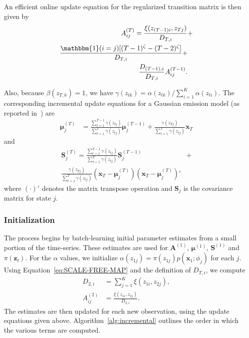 \documentclass[letterpaper]{article}
\begin{document}
An efficient online update equation for the regularized transition matrix is then given by
\begin{align*}
    A_{ij}^{(T)} = \frac{\xi(z_{(T-1)i}, z_{Tj})}{D_{T,i}} &+\\
           \frac{\mathbbm{1}(i = j)[(T-1)^\zeta - (T-2)^\zeta]}{D_{T,i}} +\\
           \frac{D_{(T-1), i}}{D_{T,i}}A_{ij}^{(T-1)}.
\end{align*}

Also, because $\beta(z_{T,k}) = 1$, we have $\gamma(z_{tk}) = \alpha(z_{tk}) / \sum_{i=1}^{K}\alpha(z_{ti})$. The corresponding incremental update equations for a Gaussian emission model (as reported in~\cite{stenger2001}) are 
\begin{align*}
    \mathbf{\mu}_{j}^{(T)} &= \frac{\sum_{t=1}^{T-1}\gamma(z_{tj})}{\sum_{t=1}^{T}\gamma(z_{tj})}\mathbf{\mu}_{j}^{(T-1)} + \frac{\gamma(z_{Tj})}{\sum_{t=1}^{T}\gamma(z_{tj})}\mathbf{x}_T
\end{align*}
and
\begin{align*}
    \mathbf{S}_j^{(T)} = \frac{\sum_{t=1}^{T-1}\gamma(z_{tj})}{\sum_{t=1}^{T}\gamma(z_{tj})}\mathbf{S}_j^{(T-1)} &+\\
     \frac{\gamma(z_{Tj})}{\sum_{t=1}^{T}\gamma(z_{tj})}\left(\mathbf{x}_T - \mathbf{\mu}_j^{(T)}\right)\left(\mathbf{x}_T - \mathbf{\mu}_j^{(T)}\right)'
\end{align*}
where $(\cdot)'$ denotes the matrix transpose operation and $\mathbf{S}_j$ is the covariance matrix for state $j$.

\subsubsection{Initialization}

The process begins by batch-learning initial parameter estimates from a small portion of the time-series. These estimates are used for $\mathbf{A}^{(1)}$, $\mathbf{\mu}^{(1)}$, $\mathbf{S}^{(1)}$ and $\pi(\mathbf{z}_t)$. For the $\alpha$ values, we initialize $\alpha(z_{1j}) = \pi(z_{1j})p(\mathbf{x}_1; \phi_j)$ for each $j$. Using Equation~\ref{eq:SCALE-FREE-MAP} and the definition of $D_{T,i}$, we compute
\begin{align*}
    D_{2,i} &= \sum_{j=1}^{K} \xi(z_{1i}, z_{2j}), \\
    A_{ij}^{(2)} &= \frac{\xi(z_{1i}, z_{2j})}{D_{2,i}}.
\end{align*}
The estimates are then updated for each new observation, using the update equations given above. Algorithm~\ref{alg:incremental} outlines the order in which the various terms are computed.
\end{document}
